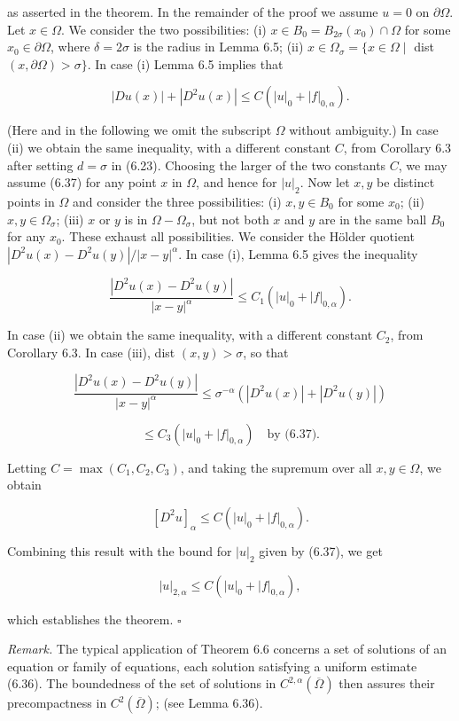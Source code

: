 as asserted in the theorem. In the remainder of the proof we assume $u=0$ on $\partial\Omega$.
Let $x \in \Omega$. We consider the two possibilities: (i) $x \in B_0 = B_{2\sigma}(x_0)\cap \Omega$ for some
$x_0 \in \partial\Omega$, where $\delta = 2\sigma$ is the radius in Lemma 6.5; (ii) $x \in \Omega_\sigma = \{x \in \Omega \mid$
dist $(x,\partial\Omega)>\sigma\}$. In case (i) Lemma 6.5 implies that

\begin{equation}
\tag{6.37}
|Du(x)|+|D^2u(x)|\le C(|u|_{0}+|f|_{0,\alpha}).
\end{equation}

\noindent (Here and in the following we omit the subscript $\Omega$ without ambiguity.) In case (ii)
we obtain the same inequality, with a different constant $C$, from Corollary 6.3 after
setting $d=\sigma$ in (6.23). Choosing the larger of the two constants $C$, we may assume
(6.37) for any point $x$ in $\Omega$, and hence for $|u|_2$.
Now let $x,y$ be distinct points in $\Omega$ and consider the three possibilities: (i) $x,y \in B_0$
for some $x_0$; (ii) $x,y \in \Omega_\sigma$; (iii) $x$ or $y$ is in $\Omega-\Omega_\sigma$, but not both $x$ and $y$ are in the
same ball $B_0$ for any $x_0$. These exhaust all possibilities. We consider the Hölder
quotient $|D^2u(x)-D^2u(y)|/|x-y|^\alpha$. In case (i), Lemma 6.5 gives the inequality

\[
\frac{|D^2u(x)-D^2u(y)|}{|x-y|^\alpha}\le C_1(|u|_{0}+|f|_{0,\alpha}).
\]

\noindent In case (ii) we obtain the same inequality, with a different constant $C_2$, from
Corollary 6.3. In case (iii), dist $(x,y)>\sigma$, so that

\[
\frac{|D^2u(x)-D^2u(y)|}{|x-y|^\alpha}\le \sigma^{-\alpha}(|D^2u(x)|+|D^2u(y)|)
\]

\[
\le C_3(|u|_{0}+|f|_{0,\alpha})\quad \text{by (6.37)}.
\]

\noindent Letting $C=\max(C_1,C_2,C_3)$, and taking the supremum over all $x,y \in \Omega$, we
obtain

\[
[D^2u]_\alpha\le C(|u|_{0}+|f|_{0,\alpha}).
\]

\noindent Combining this result with the bound for $|u|_2$ given by (6.37), we get

\[
|u|_{2,\alpha}\le C(|u|_{0}+|f|_{0,\alpha}),
\]

\noindent which establishes the theorem. $\square$

\medskip

\noindent \textit{Remark.} \quad The typical application of Theorem 6.6 concerns a set of solutions of an
equation or family of equations, each solution satisfying a uniform estimate (6.36).
The boundedness of the set of solutions in $C^{2,\alpha}(\overline{\Omega})$ then assures their precompactness
in $C^2(\overline{\Omega})$; (see Lemma 6.36).


